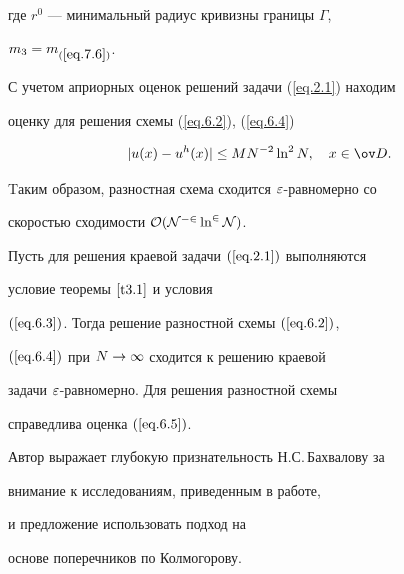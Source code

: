 где $r^0$ --- минимальный радиус кривизны границы $\varGamma$,


$m_3=m_{(\ref{eq.7.6})}$.





С учетом априорных оценок решений задачи (\ref{eq.2.1}) находим


оценку для решения схемы (\ref{eq.6.2}), (\ref{eq.6.4})


\begin{equation}\label{eq.6.5}


|u(x)-u^h(x)|\leq M N^{-2}\ln^2N,\quad x\in\od.


\end{equation}


Tаким образом, разностная схема сходится $\varepsilon$-равномерно со


скоростью сходимости $\cal O(N^{-2}\ln^2N)$.





\begin{thms} \label{t6.1}


Пусть для решения краевой задачи $(\ref{eq.2.1})$ выполняются


условие теоремы $\ref{t3.1}$ и условия


$(\ref{eq.6.3})$. Тогда решение разностной схемы $(\ref{eq.6.2})$,


$(\ref{eq.6.4})$ при $N\rightarrow \infty$ сходится к решению краевой


задачи $\varepsilon$-равномерно. Для решения разностной схемы


справедлива оценка $(\ref{eq.6.5})$.


\end{thms}








Автор выражает глубокую признательность Н.С.\,Бахвалову за


внимание к исследованиям, приведенным в работе,


и предложение использовать подход на


основе поперечников по Колмогорову.








